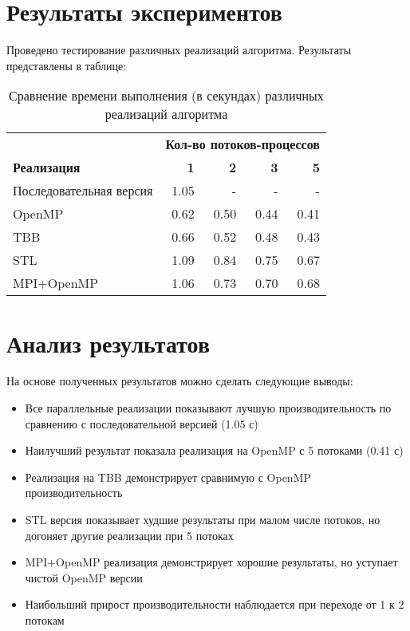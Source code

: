 \documentclass[14pt,a4paper]{extarticle}
\begin{document}
\newpage

\section{Результаты экспериментов}

Проведено тестирование различных реализаций алгоритма. Результаты представлены в таблице:

\begin{table}[H]
\centering
\caption{Сравнение времени выполнения (в секундах) различных реализаций алгоритма}
\label{tab:performance}
\begin{tabular}{lrrrr}
\toprule
& \multicolumn{4}{c}{\textbf{Кол-во потоков-процессов}} \\
\cmidrule(lr){2-5}
\textbf{Реализация} & \textbf{1} & \textbf{2} & \textbf{3} & \textbf{5} \\
\midrule
Последовательная версия & 1.05 & - & - & - \\
OpenMP & 0.62 & 0.50 & 0.44 & 0.41 \\
TBB & 0.66 & 0.52 & 0.48 & 0.43 \\
STL & 1.09 & 0.84 & 0.75 & 0.67 \\
MPI+OpenMP & 1.06 & 0.73 & 0.70 & 0.68 \\
\bottomrule
\end{tabular}
\end{table}

\section{Анализ результатов}

На основе полученных результатов можно сделать следующие выводы:

\begin{itemize}
    \item Все параллельные реализации показывают лучшую производительность по сравнению с последовательной версией (1.05 с)
    \item Наилучший результат показала реализация на OpenMP с 5 потоками (0.41 с)
    \item Реализация на TBB демонстрирует сравнимую с OpenMP производительность
    \item STL версия показывает худшие результаты при малом числе потоков, но догоняет другие реализации при 5 потоках
    \item MPI+OpenMP реализация демонстрирует хорошие результаты, но уступает чистой OpenMP версии
    \item Наибольший прирост производительности наблюдается при переходе от 1 к 2 потокам
\end{itemize}
\end{document}
